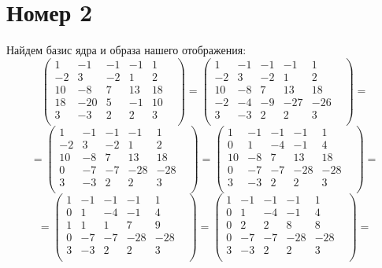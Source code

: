 \documentclass[a4paper,12pt]{article}
\begin{document}
\section*{Номер 2}
Найдем базис ядра и образа нашего отображения:
\[
\begin{pmatrix}
1 & -1 & -1 & -1 & 1 & \\
-2 & 3 & -2 & 1 & 2 & \\
10 & -8 & 7 & 13 & 18 & \\
18 & -20 & 5 & -1 & 10 & \\
3 & -3 & 2 & 2 & 3 & \\
\end{pmatrix}
=
\begin{pmatrix}
1 & -1 & -1 & -1 & 1 & \\
-2 & 3 & -2 & 1 & 2 & \\
10 & -8 & 7 & 13 & 18 & \\
-2 & -4 & -9 & -27 & -26 & \\
3 & -3 & 2 & 2 & 3 & \\
\end{pmatrix}
=
\]
\[
=
\begin{pmatrix}
1 & -1 & -1 & -1 & 1 & \\
-2 & 3 & -2 & 1 & 2 & \\
10 & -8 & 7 & 13 & 18 & \\
0 & -7 & -7 & -28 & -28 & \\
3 & -3 & 2 & 2 & 3 & \\
\end{pmatrix}
=
\begin{pmatrix}
1 & -1 & -1 & -1 & 1 & \\
0 & 1 & -4 & -1 & 4 & \\
10 & -8 & 7 & 13 & 18 & \\
0 & -7 & -7 & -28 & -28 & \\
3 & -3 & 2 & 2 & 3 & \\
\end{pmatrix}
=
\]
\[
=
\begin{pmatrix}
1 & -1 & -1 & -1 & 1 & \\
0 & 1 & -4 & -1 & 4 & \\
1 & 1 & 1 & 7 & 9 & \\
0 & -7 & -7 & -28 & -28 & \\
3 & -3 & 2 & 2 & 3 & \\
\end{pmatrix}
=
\begin{pmatrix}
1 & -1 & -1 & -1 & 1 & \\
0 & 1 & -4 & -1 & 4 & \\
0 & 2 & 2 & 8 & 8 & \\
0 & -7 & -7 & -28 & -28 & \\
3 & -3 & 2 & 2 & 3 & \\
\end{pmatrix}
=
\]
\end{document}
